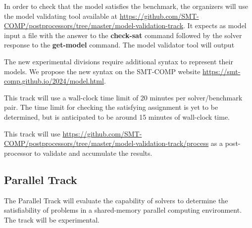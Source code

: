 \documentclass[12pt]{article}
\newcommand{\akey}[1]{\textbf{#1}\xspace}
\newcommand{\paralleltrack}{Parallel Track\xspace}
\begin{document}
In order to check that the model satisfies the benchmark, the organizers will
use the model validating tool available at
{\url{https://github.com/SMT-COMP/postprocessors/tree/master/model-validation-track}}.
It expects as model input a file with the answer to the \akey{check-sat}
command followed by the solver response to the \akey{get-model} command.
The model validator tool will output

The new experimental divisions require additional syntax to represent
their models.  We propose the new syntax on the SMT-COMP website
{\url{https://smt-comp.github.io/2024/model.html}}.

This track will use a wall-clock time limit of 20 minutes per solver/benchmark
pair. The time limit for checking the satisfying assignment is yet to be
determined, but is anticipated to be around 15 minutes of wall-clock time.

This track will use
{\url{https://github.com/SMT-COMP/postprocessors/tree/master/model-validation-track/process}}
as a post-processor
to validate and accumulate the results.


\subsection{\paralleltrack{}}
The \paralleltrack{} will evaluate the capability of solvers to
determine the satisfiability of problems in a shared-memory parallel
computing environment.  The track will be experimental.
\end{document}
